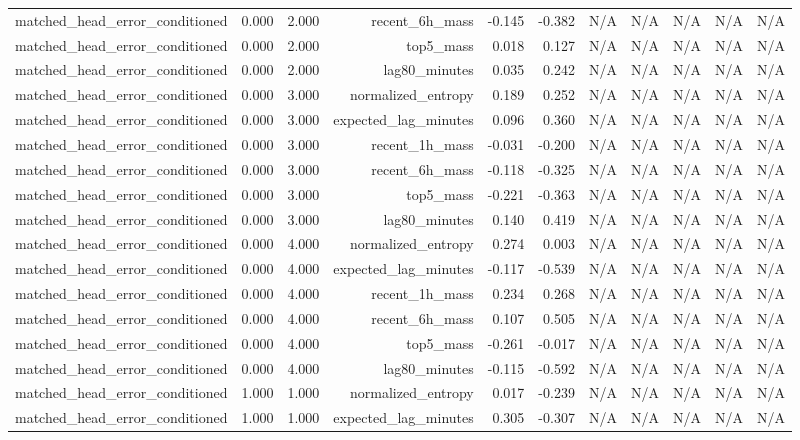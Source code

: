 \begin{table}[h!]
\begin{tabular}{lrrrrrrrrrr}
matched\_head\_error\_conditioned & 0.000 & 2.000 & recent\_6h\_mass & -0.145 & -0.382 & N/A & N/A & N/A & N/A & N/A \\
matched\_head\_error\_conditioned & 0.000 & 2.000 & top5\_mass & 0.018 & 0.127 & N/A & N/A & N/A & N/A & N/A \\
matched\_head\_error\_conditioned & 0.000 & 2.000 & lag80\_minutes & 0.035 & 0.242 & N/A & N/A & N/A & N/A & N/A \\
matched\_head\_error\_conditioned & 0.000 & 3.000 & normalized\_entropy & 0.189 & 0.252 & N/A & N/A & N/A & N/A & N/A \\
matched\_head\_error\_conditioned & 0.000 & 3.000 & expected\_lag\_minutes & 0.096 & 0.360 & N/A & N/A & N/A & N/A & N/A \\
matched\_head\_error\_conditioned & 0.000 & 3.000 & recent\_1h\_mass & -0.031 & -0.200 & N/A & N/A & N/A & N/A & N/A \\
matched\_head\_error\_conditioned & 0.000 & 3.000 & recent\_6h\_mass & -0.118 & -0.325 & N/A & N/A & N/A & N/A & N/A \\
matched\_head\_error\_conditioned & 0.000 & 3.000 & top5\_mass & -0.221 & -0.363 & N/A & N/A & N/A & N/A & N/A \\
matched\_head\_error\_conditioned & 0.000 & 3.000 & lag80\_minutes & 0.140 & 0.419 & N/A & N/A & N/A & N/A & N/A \\
matched\_head\_error\_conditioned & 0.000 & 4.000 & normalized\_entropy & 0.274 & 0.003 & N/A & N/A & N/A & N/A & N/A \\
matched\_head\_error\_conditioned & 0.000 & 4.000 & expected\_lag\_minutes & -0.117 & -0.539 & N/A & N/A & N/A & N/A & N/A \\
matched\_head\_error\_conditioned & 0.000 & 4.000 & recent\_1h\_mass & 0.234 & 0.268 & N/A & N/A & N/A & N/A & N/A \\
matched\_head\_error\_conditioned & 0.000 & 4.000 & recent\_6h\_mass & 0.107 & 0.505 & N/A & N/A & N/A & N/A & N/A \\
matched\_head\_error\_conditioned & 0.000 & 4.000 & top5\_mass & -0.261 & -0.017 & N/A & N/A & N/A & N/A & N/A \\
matched\_head\_error\_conditioned & 0.000 & 4.000 & lag80\_minutes & -0.115 & -0.592 & N/A & N/A & N/A & N/A & N/A \\
matched\_head\_error\_conditioned & 1.000 & 1.000 & normalized\_entropy & 0.017 & -0.239 & N/A & N/A & N/A & N/A & N/A \\
matched\_head\_error\_conditioned & 1.000 & 1.000 & expected\_lag\_minutes & 0.305 & -0.307 & N/A & N/A & N/A & N/A & N/A \\

\end{tabular}
\end{table}

